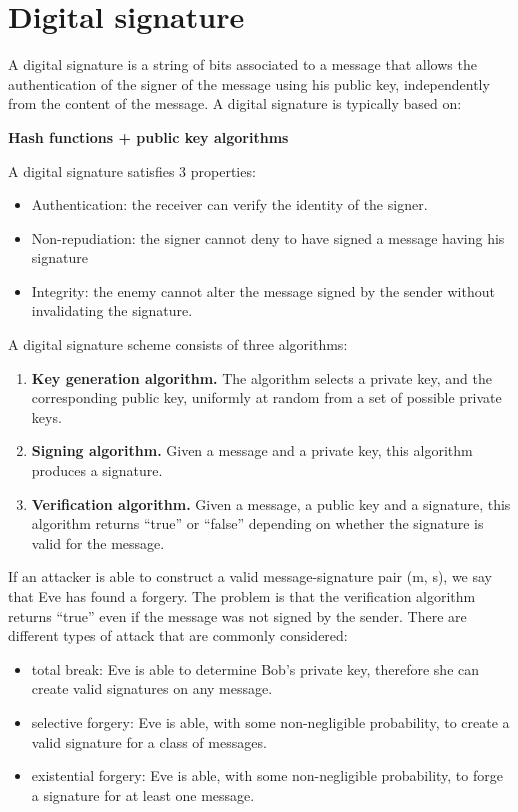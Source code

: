 \documentclass[a4paper, 10pt, titlepage]{article}
\begin{document}
\newpage
\section{Digital signature}
A digital signature is a string of bits associated to a message that allows the authentication of the signer of the message using his public key, independently from the content of the message.
A digital signature is typically based on:
\begin{center}
\textbf{Hash functions + public key algorithms}
\end{center}
A digital signature satisfies 3 properties:
\begin{itemize}
\item Authentication: the receiver can verify the identity of the signer.
\item Non-repudiation: the signer cannot deny to have signed a message having his signature
\item Integrity: the enemy cannot alter the message signed by the sender without invalidating the signature.
\end{itemize}
A digital signature scheme consists of three algorithms:
\begin{enumerate}
\item \textbf{Key generation algorithm.} 
The algorithm selects a private key, and the corresponding public key, uniformly at random from a set of possible private keys.
\item \textbf{Signing algorithm.}
Given a message and a private key, this algorithm produces a
signature. 
\item \textbf{Verification algorithm.}
Given a message, a public key and a signature, this algorithm returns “true” or “false” depending on whether the signature is valid for the message.
\end{enumerate}
If an attacker is able to construct a valid message-signature pair (m, s), we say that Eve has found a forgery. The problem is that the verification algorithm returns “true” even if the message was not signed by the sender.
There are different types of attack that are commonly considered:
\begin{itemize}
\item total break: Eve is able to determine Bob’s private key, therefore she can create valid signatures on any message.
\item selective forgery: Eve is able, with some non-negligible probability, to create a valid signature for a class of messages.
\item existential forgery: Eve is able, with some non-negligible probability, to forge a signature for at least one message.
\end{itemize}
\end{document}
